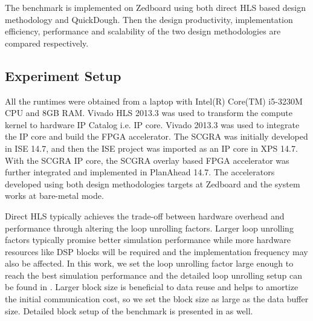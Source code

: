 The benchmark is implemented on Zedboard using both direct HLS based design methodology and QuickDough. Then the design productivity, implementation efficiency, performance and scalability of the two design methodologies are compared respectively.

\subsection{Experiment Setup}
All the runtimes were obtained from a laptop with Intel(R) Core(TM) i5-3230M CPU and 8GB RAM. Vivado HLS 2013.3 was used to transform the compute kernel to hardware IP Catalog i.e. IP core. Vivado 2013.3 was used to integrate the IP core and build the FPGA accelerator. The SCGRA was initially developed in ISE 14.7, and then the ISE project was imported as an IP core in XPS 14.7. With the SCGRA IP core, the SCGRA overlay based FPGA accelerator was further integrated and implemented in PlanAhead 14.7. The accelerators developed using both design methodologies targets at Zedboard \cite{zedboard} and the system works at bare-metal mode.

Direct HLS typically achieves the trade-off between hardware overhead and performance through altering the loop unrolling factors. Larger loop unrolling factors typically promise better simulation performance while more hardware resources like DSP blocks will be required and the implementation frequency may also be affected. In this work, we set the loop unrolling factor large enough to reach the best simulation performance and the detailed loop unrolling setup can be found in . Larger block size is beneficial to data reuse and helps to amortize the initial communication cost, so we set the block size as large as the data buffer size. Detailed block setup of the benchmark is presented in  as well.

